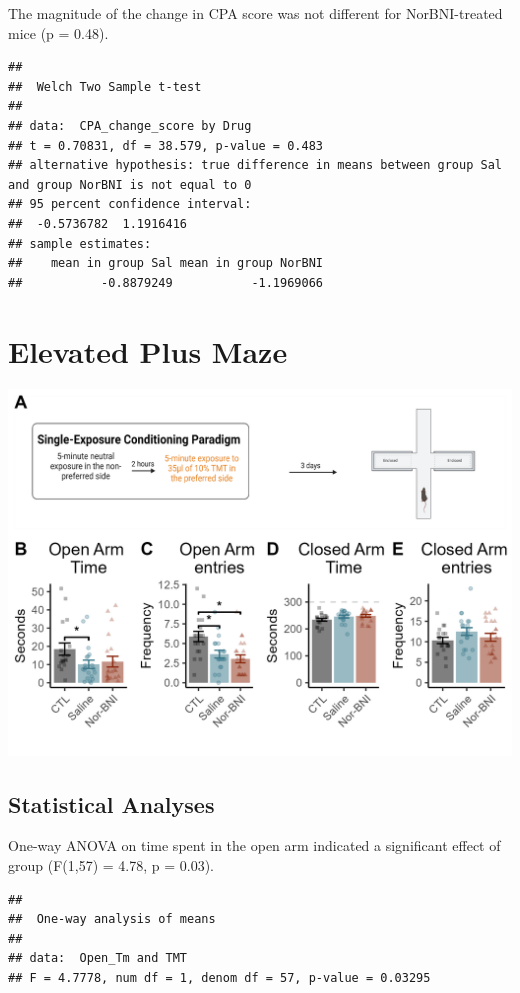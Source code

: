 \documentclass[
]{book}
\begin{document}
The magnitude of the change in CPA score was not different for NorBNI-treated mice (p = 0.48).

\begin{verbatim}
## 
##  Welch Two Sample t-test
## 
## data:  CPA_change_score by Drug
## t = 0.70831, df = 38.579, p-value = 0.483
## alternative hypothesis: true difference in means between group Sal and group NorBNI is not equal to 0
## 95 percent confidence interval:
##  -0.5736782  1.1916416
## sample estimates:
##    mean in group Sal mean in group NorBNI 
##           -0.8879249           -1.1969066
\end{verbatim}

\hypertarget{elevated-plus-maze}{%
\chapter{Elevated Plus Maze}\label{elevated-plus-maze}}

\includegraphics[width=22.92in]{Panels/EPM_panel}

\hypertarget{statistical-analyses-2}{%
\section{Statistical Analyses}\label{statistical-analyses-2}}

One-way ANOVA on time spent in the open arm indicated a significant effect of group (F(1,57) = 4.78, p = 0.03).

\begin{verbatim}
## 
##  One-way analysis of means
## 
## data:  Open_Tm and TMT
## F = 4.7778, num df = 1, denom df = 57, p-value = 0.03295
\end{verbatim}
\end{document}
